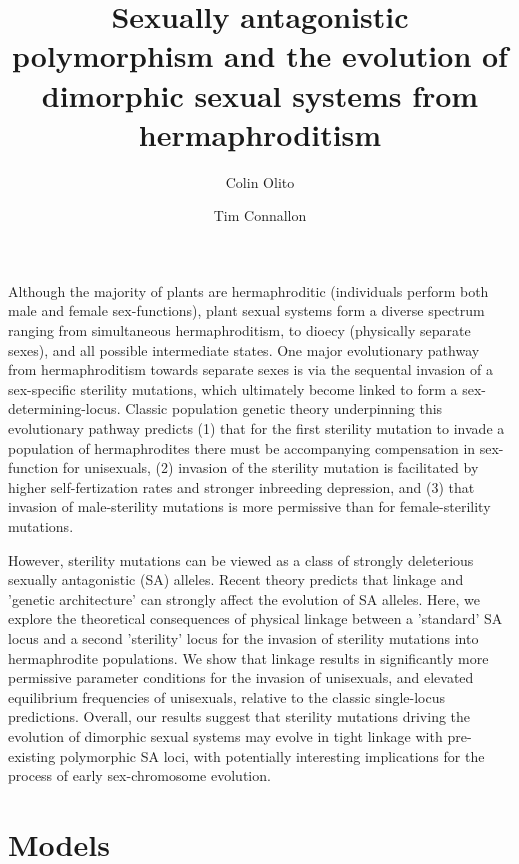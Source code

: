 \documentclass[9pt,twocolumn,twoside,lineno]{gsajnl}
\title{Sexually antagonistic polymorphism and the evolution of dimorphic sexual systems from hermaphroditism}
\author[$\ast$,1]{Colin Olito}
\author[$\ast$]{Tim Connallon}
\affil[$\ast$]{Department of Biological Sciences, Monash University, Melbourne, VIC 3800, Australia}
\begin{document}
\maketitle
\thispagestyle{firststyle}
\marginmark
\firstpagefootnote
{}
\vspace{-11pt}%

\lettrine[lines=2]{\color{color2}A}{}lthough the majority of plants are hermaphroditic (individuals perform both male and female sex-functions), plant sexual systems form a diverse spectrum ranging from simultaneous hermaphroditism, to dioecy (physically separate sexes), and all possible intermediate states. One major evolutionary pathway from hermaphroditism towards separate sexes is via the sequental invasion of a sex-specific sterility mutations, which ultimately become linked to form a sex-determining-locus. Classic population genetic theory underpinning this evolutionary pathway predicts (1) that for the first sterility mutation to invade a population of hermaphrodites there must be accompanying compensation in sex-function for unisexuals, (2) invasion of the sterility mutation is facilitated by higher self-fertization rates and stronger inbreeding depression, and (3) that invasion of male-sterility mutations is more permissive than for female-sterility mutations.

However, sterility mutations can be viewed as a class of strongly deleterious sexually antagonistic (SA) alleles. Recent theory predicts that linkage and 'genetic architecture' can strongly affect the evolution of SA alleles. Here, we explore the theoretical consequences of physical linkage between a 'standard' SA locus and a second 'sterility' locus for the invasion of sterility mutations into hermaphrodite populations. We show that linkage results in significantly more permissive parameter conditions for the invasion of unisexuals, and elevated equilibrium frequencies of unisexuals, relative to the classic single-locus predictions. Overall, our results suggest that sterility mutations driving the evolution of dimorphic sexual systems may evolve in tight linkage with pre-existing polymorphic SA loci, with potentially interesting implications for the process of early sex-chromosome evolution.



\section{Models}
\label{sec:materials:methods}
\end{document}
